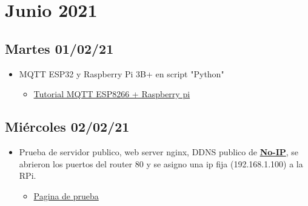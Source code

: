 \section{Junio 2021}

\subsection*{Martes 01/02/21}
    \begin{itemize}
        \item MQTT ESP32 y Raspberry Pi 3B+ en script "Python"
            \begin{itemize}
                 \item \href{https://www.instructables.com/How-to-Use-MQTT-With-the-Raspberry-Pi-and-ESP8266/}{Tutorial MQTT ESP8266 + Raspberry pi}
            \end{itemize}
\end{itemize}

\subsection*{Miércoles 02/02/21}
\begin{itemize}
    \item Prueba de servidor publico, web server nginx, DDNS publico de \href{https://www.noip.com/}{\textbf{No-IP}}, se abrieron los puertos del router 80 y se asigno una ip fija (192.168.1.100) a la RPi. 
    \begin{itemize}
        \item \href{http://facunava.ddns.net}{Pagina de prueba}
    \end{itemize}
\end{itemize}    

